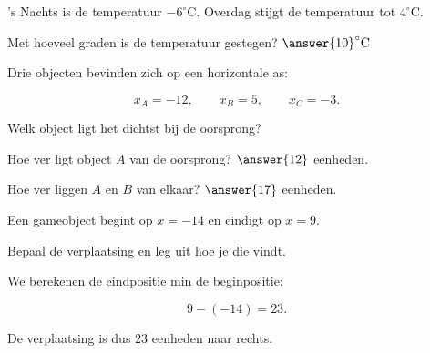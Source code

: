 \documentclass{ximera}
\begin{document}
    
    \begin{oefening}[Temperatuurverschil]{\oefB}
    
    's Nachts is de temperatuur \(-6^\circ\text{C}\).
    Overdag stijgt de temperatuur tot \(4^\circ\text{C}\).
    
    \begin{question}
    Met hoeveel graden is de temperatuur gestegen?
    \(\answer{10}^\circ\text{C}\)
    \end{question}
    
    \end{oefening}
    
    
    \begin{oefening}{\oefU}
    
    Drie objecten bevinden zich op een horizontale as:
    
    \[
    x_A=-12,
    \qquad
    x_B=5,
    \qquad
    x_C=-3.
    \]
    
    \begin{question}
    Welk object ligt het dichtst bij de oorsprong?
    
    \begin{multipleChoice}
    \end{multipleChoice}
    \end{question}
    
    \begin{question}
    Hoe ver ligt object \(A\) van de oorsprong?
    \(\answer{12}\) eenheden.
    \end{question}
    
    \begin{question}
    Hoe ver liggen \(A\) en \(B\) van elkaar?
    \(\answer{17}\) eenheden.
    \end{question}
    
    \end{oefening}
    
    
    \begin{oefening}{\oefU\ESS}
    
    Een gameobject begint op \(x=-14\) en eindigt op \(x=9\).
    
    \begin{question}
    
    Bepaal de verplaatsing en leg uit hoe je die vindt.
    
    \begin{oplossing}
    
    We berekenen de eindpositie min de beginpositie:
    
    \[
    9-(-14)=23.
    \]
    
    De verplaatsing is dus \(23\) eenheden naar rechts.
    
    \end{oplossing}
    
    \end{question}
    
    \end{oefening}
    
\end{document}
